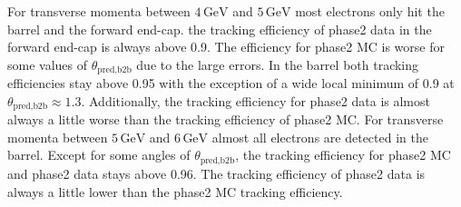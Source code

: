 \documentclass[a4paper,11pt,twosided,final,german,openbib,pdftex,listof=totoc,bibliography=totoc]{scrbook}
\begin{document}
For transverse momenta between $4\,\textrm{GeV}$ and $5\,\textrm{GeV}$ most electrons only hit the barrel and the forward end-cap. the tracking efficiency of phase2 data in the forward end-cap is always above 0.9. The efficiency for phase2 MC is worse for some values of $\theta_{\textrm{pred,b2b}}$ due to the large errors. In the barrel both tracking efficiencies stay above 0.95 with the exception of a wide local minimum of 0.9 at $\theta_{\textrm{pred,b2b}} \approx 1.3$. Additionally, the tracking efficiency for phase2 data is almost always a little worse than the tracking efficiency of phase2 MC.
For transverse momenta between $5\,\textrm{GeV}$ and $6\,\textrm{GeV}$ almost all electrons are detected in the barrel. Except for some angles of $\theta_{\textrm{pred,b2b}}$, the tracking efficiency for phase2 MC and phase2 data stays above 0.96. The tracking efficiency of phase2 data is always a little lower than the phase2 MC tracking efficiency. 
\end{document}
